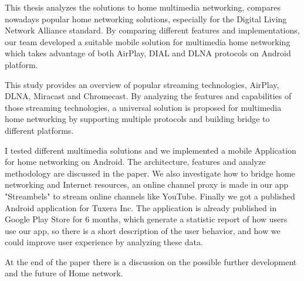 This thesis analyzes the solutions to home multimedia networking, compares
nowadays popular home networking solutions, especially for the Digital Living
Network Alliance standard. By comparing different features and implementations,
our team developed a suitable mobile solution for multimedia home networking
which takes advantage of both AirPlay, DIAL and DLNA protocols on Android
platform.

This study provides an overview of popular streaming technologies, AirPlay,
DLNA, Miracast and Chromecast. By analyzing the features and capabilities of
those streaming technologies, a universal solution is proposed for multimedia
home networking by supporting multiple protocols and building bridge to
different platforms.

I tested different multimedia solutions and we implemented a mobile Application
for home networking on Android. The architecture, features and analyze
methodology are discussed in the paper. We also investigate how to bridge home
networking and Internet resources, an online channel proxy is made in our app
"Streambels" to stream online channels like YouTube. Finally we got a published
Android application for Tuxera Inc. The application is already published in
Google Play Store for 6 months, which generate a statistic report of how users
use our app, so there is a short description of the user behavior, and how we
could improve user experience by analyzing these data.

At the end of the paper there is a discussion on the possible further
development and the future of Home network.
